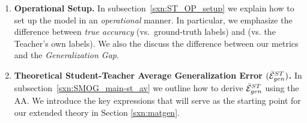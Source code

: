 \begin{enumerate}[label=4.3.\arabic*]
\item
  \textbf{Operational Setup.}
  In subsection~\ref{sxn:ST_OP_setup} we explain how to set up the  \StudentTeacher
  model in an \emph{operational} manner. 
  In particular, we emphasize the difference between \emph{true accuracy} (vs.\ ground-truth labels)
  and \Precision (vs. the Teacher’s own labels). We also the discuss the difference between
  our \Quality metrics and the \emph{Generalization Gap}.

  \item
    \textbf{Theoretical Student-Teacher Average Generalization Error $(\bar{\mathcal{E}}^{ST}_{gen})$.}
    In subsection~\ref{sxn:SMOG_main-st_av}  we outline how to derive $\bar{\mathcal{E}}^{ST}_{gen}$ using the AA.  
    We introduce the key expressions that will serve as the starting point for our extended \SemiEmpirical theory in Section \ref{sxn:matgen}.
\end{enumerate}



\clearpage
